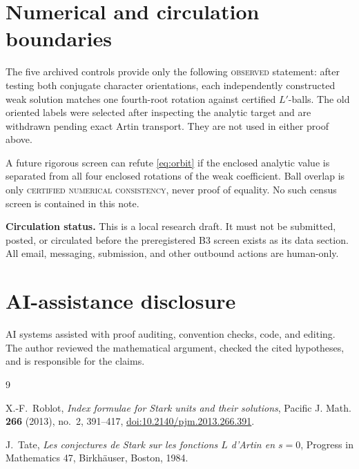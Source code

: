 \documentclass[11pt]{article}
\begin{document}
\section{Numerical and circulation boundaries}

The five archived controls provide only the following
\textsc{observed} statement: after testing both conjugate character
orientations, each independently constructed weak solution matches
one fourth-root rotation against certified \(L'\)-balls.  The old
oriented labels were selected after inspecting the analytic target and
are withdrawn pending exact Artin transport.  They are not used in
either proof above.

A future rigorous screen can refute \eqref{eq:orbit} if the enclosed
analytic value is separated from all four enclosed rotations of the
weak coefficient.  Ball overlap is only
\textsc{certified numerical consistency}, never proof of equality.
No such census screen is contained in this note.

\medskip
\noindent\textbf{Circulation status.}
This is a local research draft.  It must not be submitted, posted, or
circulated before the preregistered B3 screen exists as its data
section.  All email, messaging, submission, and other outbound actions
are human-only.

\section*{AI-assistance disclosure}

AI systems assisted with proof auditing, convention checks, code, and
editing.  The author reviewed the mathematical argument, checked the
cited hypotheses, and is responsible for the claims.

\begin{thebibliography}{9}

X.-F.~Roblot,
\emph{Index formulae for Stark units and their solutions},
Pacific J. Math. \textbf{266} (2013), no.~2, 391--417,
\href{https://doi.org/10.2140/pjm.2013.266.391}
{doi:10.2140/pjm.2013.266.391}.

J.~Tate,
\emph{Les conjectures de Stark sur les fonctions \(L\) d'Artin en
\(s=0\)},
Progress in Mathematics 47, Birkh\"auser, Boston, 1984.

\end{thebibliography}
\end{document}
